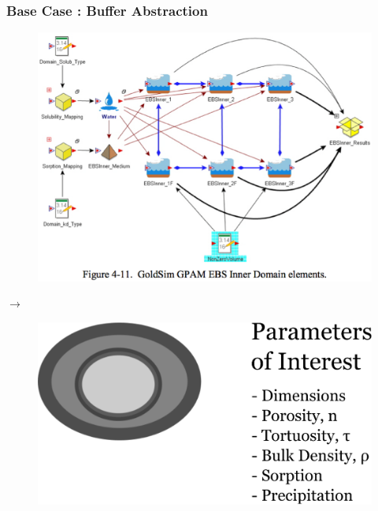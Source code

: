\begin{frame}[ctb!]
  \frametitle{Base Case : Buffer Abstraction}
  \begin{minipage}{0.45\textwidth}
    \begin{figure}[h!]
      \begin{center}
        \includegraphics[width=\textwidth]{buffer.eps}
      \end{center}
    \end{figure}
  \end{minipage}
  \hspace{0.01cm}\large{$\rightarrow$}\hspace{0.01cm}
  \begin{minipage}{0.45\textwidth}
    \begin{figure}[h!]
      \begin{center}
        \includegraphics[width=\textwidth]{abstractionBuffer.eps}
      \end{center}
    \end{figure}
  \end{minipage}
\end{frame}

